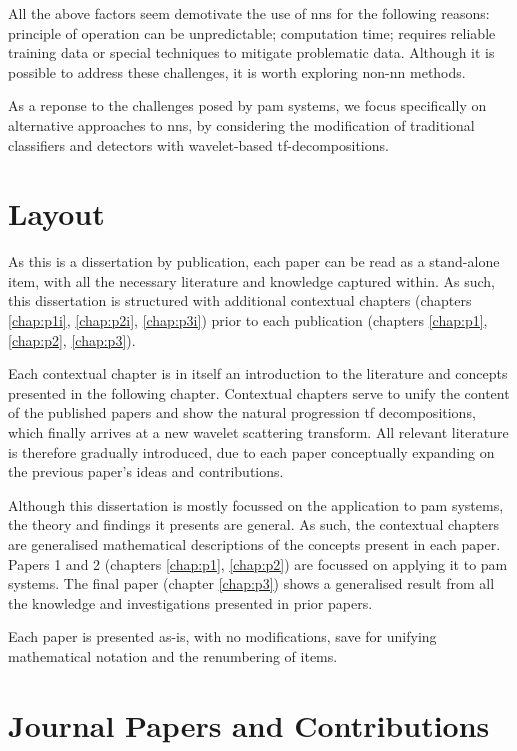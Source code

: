 All the above factors seem demotivate the use of \acp{nn} for the following reasons: principle of operation can be unpredictable; computation time; requires reliable training data or special techniques to mitigate problematic data. Although it is possible to address these challenges, it is worth exploring non-\ac{nn} methods. 

As a reponse to the challenges posed by \ac{pam} systems, we focus specifically on alternative approaches to \acp{nn}, by considering the modification of traditional classifiers and detectors with wavelet-based \ac{tf}-decompositions.

\section{Layout}

As this is a dissertation by publication, each paper can be read as a stand-alone item, with all the necessary literature and knowledge captured within. As such, this dissertation is structured with additional contextual chapters (chapters \ref*{chap:p1i}, \ref*{chap:p2i}, \ref*{chap:p3i}) prior to each publication (chapters \ref*{chap:p1}, \ref*{chap:p2}, \ref*{chap:p3}).

Each contextual chapter is in itself an introduction to the literature and concepts presented in the following chapter. Contextual chapters serve to unify the content of the published papers and show the natural progression \ac{tf} decompositions, which finally arrives at a new wavelet scattering transform. All relevant literature is therefore gradually introduced, due to each paper conceptually expanding on the previous paper's ideas and contributions.

Although this dissertation is mostly focussed on the application to \ac{pam} systems, the theory and findings it presents are general. As such, the contextual chapters are generalised mathematical descriptions of the concepts present in each paper. Papers 1 and 2 (chapters \ref*{chap:p1}, \ref*{chap:p2}) are focussed on applying it to \ac{pam} systems. The final paper (chapter \ref*{chap:p3}) shows a generalised result from all the knowledge and investigations presented in prior papers.

Each paper is presented as-is, with no modifications, save for unifying mathematical notation and the renumbering of items.


\section{Journal Papers and Contributions}

